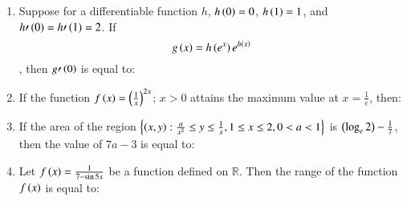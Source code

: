 \documentclass[journal,12pt,onecolumn]{IEEEtran}
\theoremstyle{remark}
\begin{document}
\begin{enumerate}
\begin{enumerate}
\end{enumerate}
\item Suppose for a differentiable function $h$, $h\left(0\right) = 0$, $h\left(1\right) = 1$, and $h\prime\left(0\right) = h\prime\left(1\right) = 2$. If $$g\left(x\right) = h\left(e^x\right)e^{h\left(x\right)}$$, then $g\prime\left(0\right)$ is equal to:
\begin{enumerate}
\end{enumerate}
\item If the function $f\left(x\right) = \left(\frac{1}{x}\right)^{2x}$; $x > 0$ attains the maximum value at $x = \frac{1}{e}$, then:
\begin{enumerate}
\end{enumerate}
\item If the area of the region $\left\{\left(x, y\right):\frac{a}{x^2}\leq y\leq \frac{1}{x}, 1 \leq x \leq 2, 0 < a < 1\right\}$ is $\left(\log_e 2\right) -\frac{1}{7}$, then the value of $7a - 3$ is equal to:
\begin{enumerate}
\end{enumerate}
\item Let $f\left(x\right) = \frac{1}{7-\sin 5x}$ be a function defined on $\mathbb{R}$. Then the range of the function $f\left(x\right)$ is equal to:

\end{enumerate}
\end{document}
